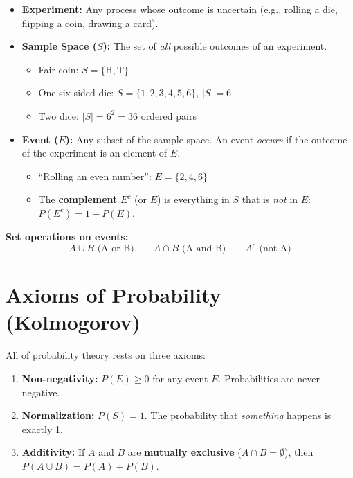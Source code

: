 \documentclass[11pt, letterpaper]{article}
\begin{document}
\begin{itemize}[noitemsep]
  \item \textbf{Experiment:} Any process whose outcome is uncertain (e.g., rolling a die, flipping a coin, drawing a card).
  \item \textbf{Sample Space ($S$):} The set of \emph{all} possible outcomes of an experiment.
    \begin{itemize}[noitemsep]
      \item Fair coin: $S = \{\text{H}, \text{T}\}$
      \item One six-sided die: $S = \{1, 2, 3, 4, 5, 6\}$, \quad $|S| = 6$
      \item Two dice: $|S| = 6^2 = 36$ ordered pairs
    \end{itemize}
  \item \textbf{Event ($E$):} Any subset of the sample space. An event \emph{occurs} if the outcome of the experiment is an element of $E$.
    \begin{itemize}[noitemsep]
      \item ``Rolling an even number'': $E = \{2, 4, 6\}$
      \item The \textbf{complement} $E^c$ (or $\bar{E}$) is everything in $S$ that is \emph{not} in $E$: $P(E^c) = 1 - P(E)$.
    \end{itemize}
\end{itemize}

\textbf{Set operations on events:}
\[
  A \cup B \text{ (A or B)} \qquad A \cap B \text{ (A and B)} \qquad A^c \text{ (not A)}
\]

\section*{Axioms of Probability (Kolmogorov)}

All of probability theory rests on three axioms:

\begin{tcolorbox}[colback=part3bg, colframe=sectionpurple, arc=3pt, boxrule=1pt]
\begin{enumerate}[noitemsep, leftmargin=*]
  \item \textbf{Non-negativity:} $P(E) \geq 0$ for any event $E$. Probabilities are never negative.
  \item \textbf{Normalization:} $P(S) = 1$. The probability that \emph{something} happens is exactly 1.
  \item \textbf{Additivity:} If $A$ and $B$ are \textbf{mutually exclusive} ($A \cap B = \emptyset$), then $P(A \cup B) = P(A) + P(B)$.
\end{enumerate}
\end{tcolorbox}
\end{document}
